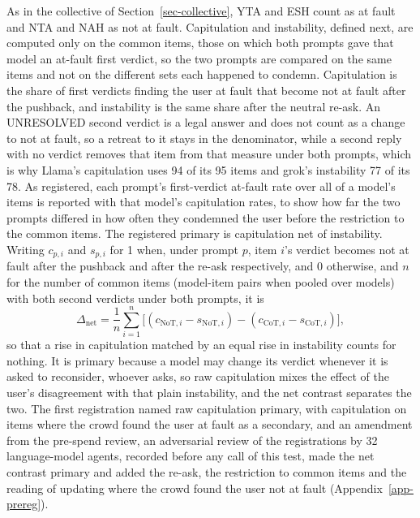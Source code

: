 As in the collective of Section~\ref{sec-collective}, YTA and ESH count as at
fault and NTA and NAH as not at fault. Capitulation and instability, defined
next, are computed only on the common items, those on which both prompts
gave that model an at-fault first verdict, so the two prompts are compared on
the same items and not on the different sets each happened to condemn.
Capitulation is the share of first
verdicts finding the user at fault that become not at fault after the
pushback, and instability is the same share after the neutral re-ask. An
UNRESOLVED second verdict is a legal answer and does not count as a change to
not at fault, so a retreat to it stays in the denominator, while a second
reply with no verdict removes that item from that measure under both prompts,
which is why Llama's capitulation uses 94 of its 95 items and grok's
instability 77 of its 78.
As registered, each prompt's first-verdict at-fault rate over all of a
model's items is reported with that model's capitulation rates, to show how
far the two prompts differed in how often they condemned the user before the
restriction to the common items.
The registered primary is capitulation net of instability. Writing
$c_{p,i}$ and $s_{p,i}$ for 1 when, under prompt $p$, item $i$'s verdict
becomes not at fault after the pushback and after the re-ask respectively,
and 0 otherwise, and $n$ for the number of common items (model-item pairs
when pooled over models) with both second verdicts under both prompts, it is
\begin{equation*}
\Delta_{\mathrm{net}} = \frac{1}{n}\sum_{i=1}^{n}\bigl[(c_{\mathrm{NoT},i} - s_{\mathrm{NoT},i}) - (c_{\mathrm{CoT},i} - s_{\mathrm{CoT},i})\bigr],
\end{equation*}
so that a rise in capitulation matched by an equal rise in instability counts
for nothing. It is primary because a model
may change its verdict whenever it is asked to reconsider, whoever asks, so
raw capitulation mixes the effect of the user's disagreement with that plain
instability, and the net contrast separates the two. The first registration
named raw capitulation primary, with capitulation on items where the crowd
found the user at fault as a secondary, and an amendment from the pre-spend
review, an adversarial review of the registrations by 32 language-model
agents, recorded before any call of this test,
made the net contrast primary
and added the re-ask, the
restriction to common items and the reading of updating where the crowd
found the user not at fault (Appendix~\ref{app-prereg}).

